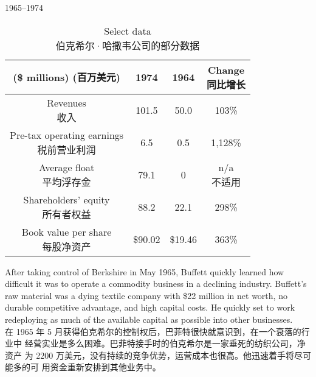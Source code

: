 \begin{section}{1965--1974}

\begin{table}[!htbp]
  \centering
\begin{center}
\begin{tabular}{cccc}
  \toprule
  \makecell[c]{(\$ millions) \\ (百万美元)} & 1974 & 1964 & \makecell[c]{Change \\ 同比增长} \\
  \midrule
  \makecell[c]{Revenues \\ 收入} & 101.5 & 50.0 & 103\% \\
  \makecell[c]{Pre-tax operating earnings \\ 税前营业利润} & 6.5 & 0.5 & 1,128\% \\
  \makecell[c]{Average float \\ 平均浮存金} & 79.1 & 0 & \makecell[c]{n/a \\ 不适用} \\
  \makecell[c]{Shareholders' equity \\ 所有者权益} & 88.2 & 22.1 & 298\% \\
  \makecell[c]{Book value per share \\ 每股净资产} & \$90.02 & \$19.46 & 363\% \\
  \bottomrule
\end{tabular}
\caption{Select data \\ 伯克希尔·哈撒韦公司的部分数据}
\end{center}
\end{table}

\begin{verseparallel}
  {
    After taking control of Berkshire in May 1965, Buffett quickly learned how
    difficult it was to operate a commodity business in a declining industry.
    Buffett's raw material was a dying textile company with \$22 million in net
    worth, no durable competitive advantage, and high capital costs. He quickly
    set to work redeploying as much of the available capital as possible into
    other businesses. \\
  }
  {
    在 1965 年 5 月获得伯克希尔的控制权后，巴菲特很快就意识到，在一个衰落的行业中
    经营实业是多么困难。巴菲特接手时的伯克希尔是一家垂死的纺织公司，净资产
    为 2200 万美元，没有持续的竞争优势，运营成本也很高。他迅速着手将尽可能多的可
    用资金重新安排到其他业务中。
  }
\end{verseparallel}


\end{section}
